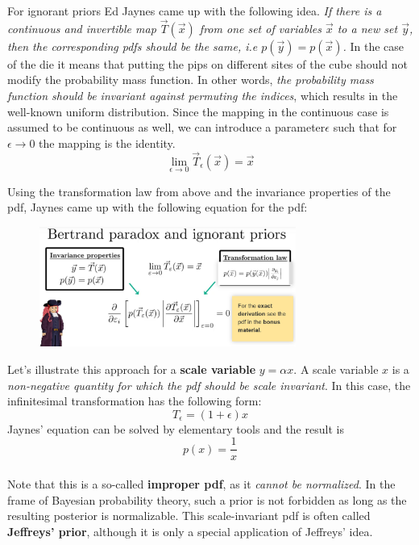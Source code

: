 \documentclass[12pt, a4paper]{scrartcl}
\begin{document}
For ignorant priors Ed Jaynes came up with the following idea. \textit{If there is a
continuous and invertible map $\vec{T}(\vec{x})$ from one set of variables $\vec{x}$ to a
new set $\vec{y}$, then the corresponding pdfs should be the same, i.e $p(\vec{y})=p(\vec{x})$.} In the case of the die it
means that putting the pips on different sites of the cube should not modify the probability mass function.
In other words, \textit{the probability mass function should be invariant against
permuting the indices}, which results in the well-known uniform distribution.
Since the mapping in the continuous case is assumed to be continuous as
well, we can introduce a parameter$\epsilon$ such that for $\epsilon\rightarrow 0$ the mapping is the
identity. \[\lim_{\epsilon\rightarrow 0}\vec{T}_{\epsilon}(\vec{x})=\vec{x}\]

Using the transformation law from above and the invariance properties of
the pdf, Jaynes came up with the following equation for the pdf:%
 \begin{figure}[H]
	\centering
	\includegraphics[width=0.75\textwidth]{8_8.png}
\end{figure}

Let’s illustrate this approach for a \textbf{scale variable} $y=\alpha x$. A scale variable $x$ is a
\textit{non-negative quantity for which the pdf should be scale invariant}. In this case, the infinitesimal transformation has the following form:\[T_{\epsilon}=(1+\epsilon)x\]
Jaynes’ equation can be solved by elementary tools
and the result is 
\begin{equation*}\boxed{p(x)=\frac 1x
}\end{equation*}\\
Note that this is a so-called \textbf{improper pdf}, as it \textit{cannot be normalized}. In the
frame of Bayesian probability theory, such a prior is not forbidden as long as
the resulting posterior is normalizable.
This scale-invariant pdf is often called \textbf{Jeffreys’ prior}, although it is only a
special application of Jeffreys’ idea.\\
\end{document}
